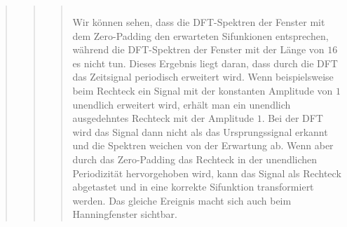 \begin{quote}
\begin{quote}
\begin{quote}
\begin{center}
\begin{tabular}{ll}
                \end{tabular}
                \end{center}
                
        Wir können sehen, dass die DFT-Spektren der Fenster mit dem Zero-Padding
        den erwarteten Sifunkionen entsprechen, während die DFT-Spektren der
        Fenster mit der Länge von $16$ es nicht tun. Dieses Ergebnis liegt
        daran, dass durch die DFT das Zeitsignal periodisch erweitert wird. Wenn
        beispielsweise beim Rechteck ein Signal mit der konstanten Amplitude von
        $1$ unendlich erweitert wird, erhält man ein unendlich ausgedehntes Rechteck mit der
        Amplitude $1$. Bei der DFT wird das Signal dann nicht als das
        Ursprungssignal erkannt und die Spektren weichen von der Erwartung ab.
        Wenn aber durch das Zero-Padding das Rechteck in der unendlichen Periodizität hervorgehoben wird, 
        kann das Signal als Rechteck abgetastet und in eine korrekte Sifunktion transformiert
        werden. Das gleiche Ereignis macht sich auch beim Hanningfenster
        sichtbar. 
            
		\end{quote}
        
        
        
        
        
    \end{quote}
\end{quote}


